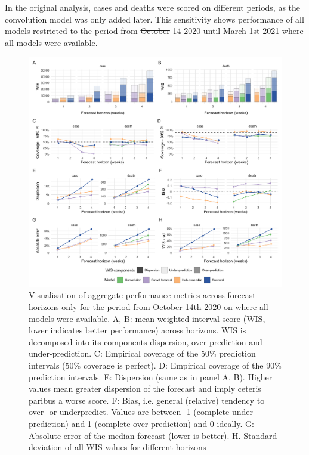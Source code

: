 \documentclass[
]{article}
\providecommand{\DIFaddtex}[1]{{\protect\color{blue}\uwave{#1}}} %
\providecommand{\DIFdeltex}[1]{{\protect\color{red}\sout{#1}}}                      %
\providecommand{\DIFaddbegin}{} %
\providecommand{\DIFaddend}{} %
\providecommand{\DIFdelbegin}{} %
\providecommand{\DIFdelend}{} %
\providecommand{\DIFaddFL}[1]{\DIFadd{#1}} %
\providecommand{\DIFdelFL}[1]{\DIFdel{#1}} %
\providecommand{\DIFaddbeginFL}{} %
\providecommand{\DIFaddendFL}{} %
\providecommand{\DIFdelbeginFL}{} %
\providecommand{\DIFdelendFL}{} %
\providecommand{\DIFadd}[1]{\texorpdfstring{\DIFaddtex{#1}}{#1}} %
\providecommand{\DIFdel}[1]{\texorpdfstring{\DIFdeltex{#1}}{}} %
\newcommand{\DIFscaledelfig}{0.5}
\newlength{\DIFdelgraphicswidth} %
\newlength{\DIFdelgraphicsheight} %
\newcommand{\DIFaddincludegraphics}[2][]{{\color{blue}\fbox{\DIFOincludegraphics[#1]{#2}}}} %
\newcommand{\DIFdelincludegraphics}[2][]{%
\sbox{\DIFdelgraphicsbox}{\DIFOincludegraphics[#1]{#2}}%
\settoboxwidth{\DIFdelgraphicswidth}{\DIFdelgraphicsbox} %
\settoboxtotalheight{\DIFdelgraphicsheight}{\DIFdelgraphicsbox} %
\scalebox{\DIFscaledelfig}{%
\parbox[b]{\DIFdelgraphicswidth}{\usebox{\DIFdelgraphicsbox}\\[-\baselineskip] \rule{\DIFdelgraphicswidth}{0em}}\llap{\resizebox{\DIFdelgraphicswidth}{\DIFdelgraphicsheight}{%
\setlength{\unitlength}{\DIFdelgraphicswidth}%
\begin{picture}(1,1)%
\thicklines\linethickness{2pt} %
{\color[rgb]{1,0,0}\put(0,0){\framebox(1,1){}}}%
{\color[rgb]{1,0,0}\put(0,0){\line( 1,1){1}}}%
{\color[rgb]{1,0,0}\put(0,1){\line(1,-1){1}}}%
\end{picture}%
}\hspace*{3pt}}} %
} %
\DeclareRobustCommand{\DIFaddbegin}{\DIFOaddbegin \let\includegraphics\DIFaddincludegraphics} %
\DeclareRobustCommand{\DIFaddend}{\DIFOaddend \let\includegraphics\DIFOincludegraphics} %
\DeclareRobustCommand{\DIFdelbegin}{\DIFOdelbegin \let\includegraphics\DIFdelincludegraphics} %
\DeclareRobustCommand{\DIFdelend}{\DIFOaddend \let\includegraphics\DIFOincludegraphics} %
\DeclareRobustCommand{\DIFaddbeginFL}{\DIFOaddbeginFL \let\includegraphics\DIFaddincludegraphics} %
\DeclareRobustCommand{\DIFaddendFL}{\DIFOaddendFL \let\includegraphics\DIFOincludegraphics} %
\DeclareRobustCommand{\DIFdelbeginFL}{\DIFOdelbeginFL \let\includegraphics\DIFdelincludegraphics} %
\DeclareRobustCommand{\DIFdelendFL}{\DIFOaddendFL \let\includegraphics\DIFOincludegraphics} %
\begin{document}
In the original analysis, cases and deaths were scored on different periods, as the convolution model was only added later. This sensitivity shows performance of all models restricted to the period from \DIFdelbegin \DIFdel{October }\DIFdelend \DIFaddbegin \DIFadd{December }\DIFaddend 14 2020 until March 1st 2021 where all models were available.

\begin{figure}[H]
\includegraphics[width=1\linewidth,]{../analysis/plots/aggregate-performance-all-late-period-v4} \caption{Visualisation of aggregate performance metrics across forecast horizons only for the period from \DIFdelbeginFL \DIFdelFL{October }\DIFdelendFL \DIFaddbeginFL \DIFaddFL{December }\DIFaddendFL 14th 2020 on where all models were available. A, B: mean weighted interval score (WIS, lower indicates better performance) across horizons. WIS is decomposed into its components dispersion, over-prediction and under-prediction. C: Empirical coverage of the 50\% prediction intervals (50\% coverage is perfect). D: Empirical coverage of the 90\% prediction intervals. E: Dispersion (same as in panel A, B). Higher values mean greater dispersion of the forecast and imply ceteris paribus a worse score. F: Bias, i.e. general (relative) tendency to over- or underpredict. Values are between -1 (complete under-prediction) and 1 (complete over-prediction) and 0 ideally. G: Absolute error of the median forecast (lower is better). H. Standard deviation of all WIS values for different horizons}\label{fig:agg-performance-all-late}
\end{figure}
\end{document}
